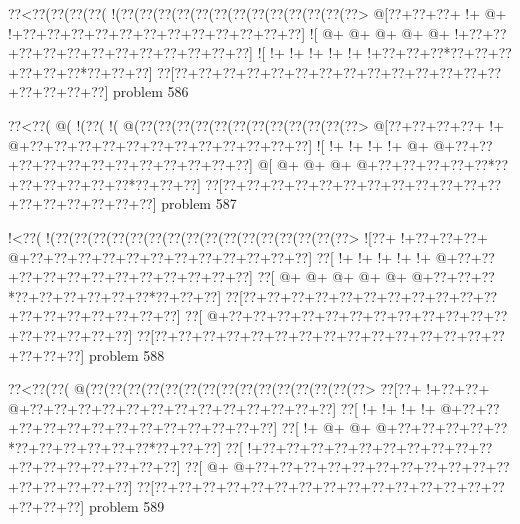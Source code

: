 \vbox{\vbox{\goo
\0??<\0??(\0??(\0??(\0??(\- !(\0??(\0??(\0??(\0??(\0??(\0??(\0??(\0??(\0??(\0??(\0??(\0??(\0??>
\- @[\0??+\0??+\0??+\- !+\- @+\- !+\0??+\0??+\0??+\0??+\0??+\0??+\0??+\0??+\0??+\0??+\0??+\0??]
\- ![\- @+\- @+\- @+\- @+\- @+\- !+\0??+\0??+\0??+\0??+\0??+\0??+\0??+\0??+\0??+\0??+\0??+\0??]
\- ![\- !+\- !+\- !+\- !+\- !+\- !+\0??+\0??+\0??*\0??+\0??+\0??+\0??+\0??+\0??*\0??+\0??+\0??]
\0??[\0??+\0??+\0??+\0??+\0??+\0??+\0??+\0??+\0??+\0??+\0??+\0??+\0??+\0??+\0??+\0??+\0??+\0??]
}
\hfil problem 586\hfil\break
}



\vbox{\vbox{\goo
\0??<\0??(\- @(\- !(\0??(\- !(\- @(\0??(\0??(\0??(\0??(\0??(\0??(\0??(\0??(\0??(\0??(\0??(\0??>
\- @[\0??+\0??+\0??+\0??+\- !+\- @+\0??+\0??+\0??+\0??+\0??+\0??+\0??+\0??+\0??+\0??+\0??+\0??]
\- ![\- !+\- !+\- !+\- !+\- @+\- @+\0??+\0??+\0??+\0??+\0??+\0??+\0??+\0??+\0??+\0??+\0??+\0??]
\- @[\- @+\- @+\- @+\- @+\0??+\0??+\0??+\0??+\0??*\0??+\0??+\0??+\0??+\0??+\0??*\0??+\0??+\0??]
\0??[\0??+\0??+\0??+\0??+\0??+\0??+\0??+\0??+\0??+\0??+\0??+\0??+\0??+\0??+\0??+\0??+\0??+\0??]
}
\hfil problem 587\hfil\break
}



\vbox{\vbox{\goo
\- !<\0??(\- !(\0??(\0??(\0??(\0??(\0??(\0??(\0??(\0??(\0??(\0??(\0??(\0??(\0??(\0??(\0??(\0??>
\- ![\0??+\- !+\0??+\0??+\0??+\- @+\0??+\0??+\0??+\0??+\0??+\0??+\0??+\0??+\0??+\0??+\0??+\0??]
\0??[\- !+\- !+\- !+\- !+\- !+\- @+\0??+\0??+\0??+\0??+\0??+\0??+\0??+\0??+\0??+\0??+\0??+\0??]
\0??[\- @+\- @+\- @+\- @+\- @+\- @+\0??+\0??+\0??*\0??+\0??+\0??+\0??+\0??+\0??*\0??+\0??+\0??]
\0??[\0??+\0??+\0??+\0??+\0??+\0??+\0??+\0??+\0??+\0??+\0??+\0??+\0??+\0??+\0??+\0??+\0??+\0??]
\0??[\- @+\0??+\0??+\0??+\0??+\0??+\0??+\0??+\0??+\0??+\0??+\0??+\0??+\0??+\0??+\0??+\0??+\0??]
\0??[\0??+\0??+\0??+\0??+\0??+\0??+\0??+\0??+\0??+\0??+\0??+\0??+\0??+\0??+\0??+\0??+\0??+\0??]
}
\hfil problem 588\hfil\break
}



\vbox{\vbox{\goo
\0??<\0??(\0??(\- @(\0??(\0??(\0??(\0??(\0??(\0??(\0??(\0??(\0??(\0??(\0??(\0??(\0??(\0??(\0??>
\0??[\0??+\- !+\0??+\0??+\- @+\0??+\0??+\0??+\0??+\0??+\0??+\0??+\0??+\0??+\0??+\0??+\0??+\0??]
\0??[\- !+\- !+\- !+\- !+\- @+\0??+\0??+\0??+\0??+\0??+\0??+\0??+\0??+\0??+\0??+\0??+\0??+\0??]
\0??[\- !+\- @+\- @+\- @+\0??+\0??+\0??+\0??+\0??*\0??+\0??+\0??+\0??+\0??+\0??*\0??+\0??+\0??]
\0??[\- !+\0??+\0??+\0??+\0??+\0??+\0??+\0??+\0??+\0??+\0??+\0??+\0??+\0??+\0??+\0??+\0??+\0??]
\0??[\- @+\- @+\0??+\0??+\0??+\0??+\0??+\0??+\0??+\0??+\0??+\0??+\0??+\0??+\0??+\0??+\0??+\0??]
\0??[\0??+\0??+\0??+\0??+\0??+\0??+\0??+\0??+\0??+\0??+\0??+\0??+\0??+\0??+\0??+\0??+\0??+\0??]
}
\hfil problem 589\hfil\break
}



